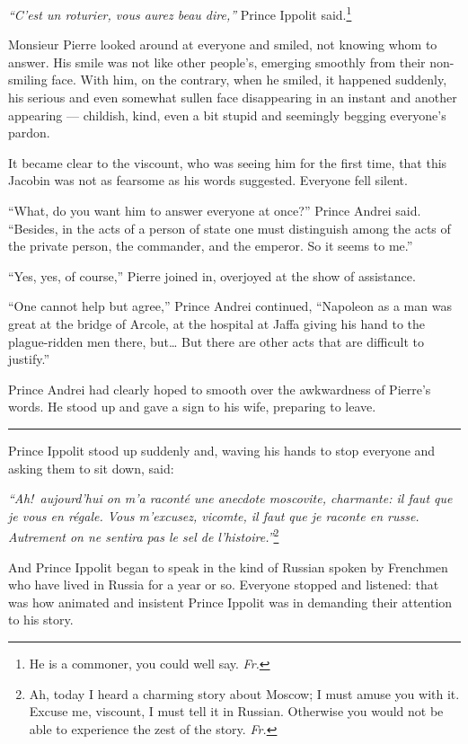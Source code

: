 \textit{``C'est un roturier, vous aurez beau dire,''} Prince Ippolit said.\footnote{He is a commoner, you could well say. \textit{Fr.}}

Monsieur Pierre looked around at everyone and smiled, not knowing whom to answer. His smile was not like other people's, emerging smoothly from their non-smiling face. With him, on the contrary, when he smiled, it happened suddenly, his serious and even somewhat sullen face disappearing in an instant and another appearing --- childish, kind, even a bit stupid and seemingly begging everyone's pardon.

It became clear to the viscount, who was seeing him for the first time, that this Jacobin was not as fearsome as his words suggested. Everyone fell silent.

``What, do you want him to answer everyone at once?'' Prince Andrei said. ``Besides, in the acts of a person of state one must distinguish among the acts of the private person, the commander, and the emperor. So it seems to me.'' %

``Yes, yes, of course,'' Pierre joined in, overjoyed at the show of assistance. %

``One cannot help but agree,'' Prince Andrei continued, ``Napoleon as a man was great at the bridge of Arcole, at the hospital at Jaffa giving his hand to the plague-ridden men there, but\ldots{} But there are other acts that are difficult to justify.'' %

Prince Andrei had clearly hoped to smooth over the awkwardness of Pierre's words. He stood up and gave a sign to his wife, preparing to leave.

\begin{center}
\rule{5em}{0.4pt}
\end{center}

Prince Ippolit stood up suddenly and, waving his hands to stop everyone and asking them to sit down, said:

\textit{``Ah!~aujourd'hui on m'a racont\'e une anecdote moscovite, charmante: il faut que je vous en r\'egale. Vous m'excusez, vicomte, il faut que je raconte en russe. Autrement on ne sentira pas le sel de l'histoire.''}\footnote{Ah, today I heard a charming story about Moscow; I must amuse you with it. Excuse me, viscount, I must tell it in Russian. Otherwise you would not be able to experience the zest of the story. \textit{Fr.}} %

And Prince Ippolit began to speak in the kind of Russian spoken by Frenchmen who have lived in Russia for a year or so. Everyone stopped and listened: that was how animated and insistent Prince Ippolit was in demanding their attention to his story.

